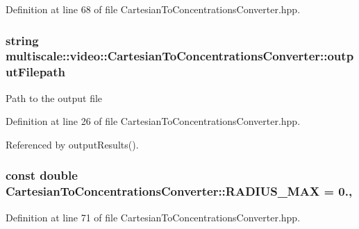 Definition at line 68 of file Cartesian\-To\-Concentrations\-Converter.\-hpp.

\hypertarget{classmultiscale_1_1video_1_1CartesianToConcentrationsConverter_a9215448e33876a581b206a89b6651fd0}{
\subsubsection[{output\-Filepath}]{\setlength{\rightskip}{0pt plus 5cm}string multiscale\-::video\-::\-Cartesian\-To\-Concentrations\-Converter\-::output\-Filepath\hspace{0.3cm}{\ttfamily [private]}}}\label{classmultiscale_1_1video_1_1CartesianToConcentrationsConverter_a9215448e33876a581b206a89b6651fd0}
Path to the output file 

Definition at line 26 of file Cartesian\-To\-Concentrations\-Converter.\-hpp.



Referenced by output\-Results().

\hypertarget{classmultiscale_1_1video_1_1CartesianToConcentrationsConverter_a2e14aa1021a91a2f1df2bd4904a2ca2f}{
\subsubsection[{R\-A\-D\-I\-U\-S\-\_\-\-M\-A\-X}]{\setlength{\rightskip}{0pt plus 5cm}const double Cartesian\-To\-Concentrations\-Converter\-::\-R\-A\-D\-I\-U\-S\-\_\-\-M\-A\-X = 0.\hspace{0.3cm}{\ttfamily [static]}, {\ttfamily [private]}}}\label{classmultiscale_1_1video_1_1CartesianToConcentrationsConverter_a2e14aa1021a91a2f1df2bd4904a2ca2f}


Definition at line 71 of file Cartesian\-To\-Concentrations\-Converter.\-hpp.


